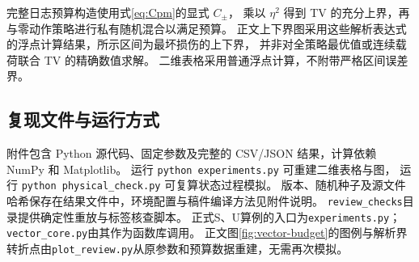 完整日志预算构造使用式\eqref{eq:Cpm}的显式 $C_\pm$，
乘以 $\eta^2$ 得到 TV 的充分上界，再与零动作策略进行私有随机混合以满足预算。
正文上下界图采用这些解析表达式的浮点计算结果，所示区间为最坏损伤的上下界，
并非对全策略最优值或连续载荷联合 TV 的精确数值求解。
二维表格采用普通浮点计算，不附带严格区间误差界。



\subsection{复现文件与运行方式}
附件包含 Python 源代码、固定参数及完整的 CSV/JSON 结果，计算依赖 NumPy 和 Matplotlib。
运行 \texttt{python experiments.py} 可重建二维表格与图，
运行 \texttt{python physical\_check.py} 可复算状态过程模拟。
版本、随机种子及源文件哈希保存在结果文件中，环境配置与稿件编译方法见附件说明。
\texttt{review\_checks}目录提供确定性重放与标签核查脚本。
正式S、U算例的入口为\texttt{experiments.py}；\texttt{vector\_core.py}由其作为函数库调用。
正文图\ref{fig:vector-budget}的图例与解析界转折点由\texttt{plot\_review.py}从原参数和预算数据重建，无需再次模拟。
